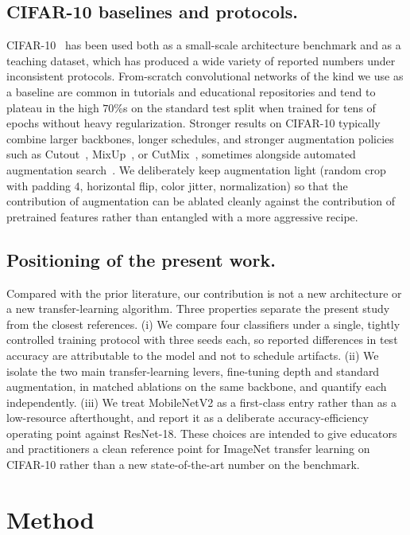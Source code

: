 \documentclass[10pt,twocolumn]{article}
\begin{document}
\subsection*{CIFAR-10 baselines and protocols.}
CIFAR-10~\cite{krizhevsky2009cifar} has been used both as a small-scale architecture benchmark and as a teaching dataset, which has produced a wide variety of reported numbers under inconsistent protocols. From-scratch convolutional networks of the kind we use as a baseline are common in tutorials and educational repositories and tend to plateau in the high $70$\%s on the standard test split when trained for tens of epochs without heavy regularization. Stronger results on CIFAR-10 typically combine larger backbones, longer schedules, and stronger augmentation policies such as Cutout~\cite{devries2017cutout}, MixUp~\cite{zhang2018mixup}, or CutMix~\cite{yun2019cutmix}, sometimes alongside automated augmentation search~\cite{cubuk2019autoaugment}. We deliberately keep augmentation light (random crop with padding $4$, horizontal flip, color jitter, normalization) so that the contribution of augmentation can be ablated cleanly against the contribution of pretrained features rather than entangled with a more aggressive recipe.

\subsection*{Positioning of the present work.}
Compared with the prior literature, our contribution is not a new architecture or a new transfer-learning algorithm. Three properties separate the present study from the closest references. (i) We compare four classifiers under a single, tightly controlled training protocol with three seeds each, so reported differences in test accuracy are attributable to the model and not to schedule artifacts. (ii) We isolate the two main transfer-learning levers, fine-tuning depth and standard augmentation, in matched ablations on the same backbone, and quantify each independently. (iii) We treat MobileNetV2 as a first-class entry rather than as a low-resource afterthought, and report it as a deliberate accuracy-efficiency operating point against ResNet-18. These choices are intended to give educators and practitioners a clean reference point for ImageNet transfer learning on CIFAR-10 rather than a new state-of-the-art number on the benchmark.


\section{Method}
\label{sec:method}
\end{document}
